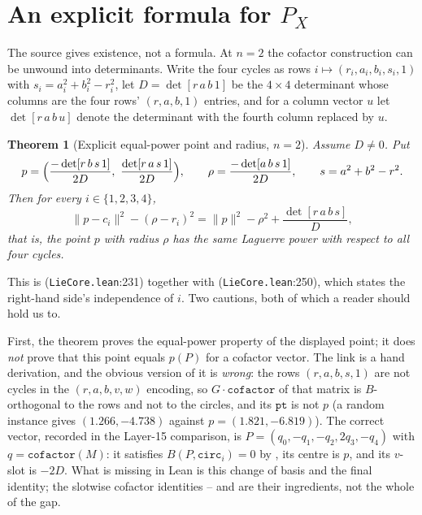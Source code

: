\documentclass[11pt]{article}
\newtheorem{theorem}{Theorem}
\theoremstyle{definition}
\theoremstyle{remark}
\newcommand{\src}[3]{\texttt{#2}:#3}
\begin{document}
\section{An explicit formula for \texorpdfstring{$P_X$}{P\_X}}\label{sec:explicit}

The source gives existence, not a formula. At $n=2$ the cofactor construction can be unwound into
determinants. Write the four cycles as rows $i\mapsto(r_i,a_i,b_i,s_i,1)$ with
$s_i=a_i^2+b_i^2-r_i^2$, let $D=\det[r\,a\,b\,1]$ be the $4\times4$ determinant whose columns are
the four rows' $(r,a,b,1)$ entries, and for a column vector $u$ let $\det[r\,a\,b\,u]$ denote the
determinant with the fourth column replaced by $u$.

\begin{theorem}[Explicit equal-power point and radius, $n=2$]\label{thm:explicit}
Assume $D\neq0$. Put
\[
p=\Bigl(\frac{-\det[r\,b\,s\,1]}{2D},\ \frac{\det[r\,a\,s\,1]}{2D}\Bigr),
\qquad
\rho=\frac{-\det[a\,b\,s\,1]}{2D},
\qquad s=a^2+b^2-r^2 .
\]
Then for every $i\in\{1,2,3,4\}$,
\[
\lVert p-c_i\rVert^2-(\rho-r_i)^2=\lVert p\rVert^2-\rho^2+\frac{\det[r\,a\,b\,s]}{D},
\]
that is, the point $p$ with radius $\rho$ has the \emph{same} Laguerre power with respect to all four
cycles.
\end{theorem}

This is  (\src{PaperK}{LieCore.lean}{231}) together with
 (\src{PaperK}{LieCore.lean}{250}), which states the
right-hand side's independence of $i$. Two cautions, both of which a reader should hold us to.

First, the theorem proves the equal-power property of the displayed point; it does \emph{not} prove
that this point equals $p(P)$ for a cofactor vector. The link is a hand derivation, and the obvious
version of it is \emph{wrong}: the rows $(r,a,b,s,1)$ are not cycles in the $(r,a,b,v,w)$ encoding,
so $G\cdot\texttt{cofactor}$ of that matrix is $B$-orthogonal to the rows and not to the circles,
and its $\texttt{pt}$ is not $p$ (a random instance gives $(1.266,-4.738)$ against
$p=(1.821,-6.819)$). The correct vector, recorded in the Layer-15 comparison, is
$P=(q_0,-q_1,-q_2,2q_3,-q_4)$ with $q=\texttt{cofactor}(M)$: it satisfies
$B(P,\texttt{circ}_i)=0$ by , its centre is $p$, and its $v$-slot is
$-2D$. What is missing in Lean is this change of basis and the final identity; the slotwise cofactor
identities -- and  are their
ingredients, not the whole of the gap.
\end{document}
